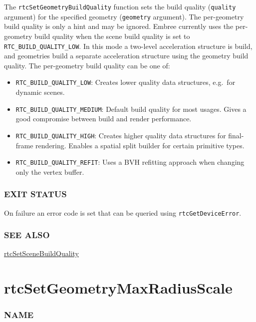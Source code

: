 The \texttt{rtcSetGeometryBuildQuality} function sets the build quality
(\texttt{quality} argument) for the specified geometry
(\texttt{geometry} argument). The per-geometry build quality is only a
hint and may be ignored. Embree currently uses the per-geometry build
quality when the scene build quality is set to
\texttt{RTC\_BUILD\_QUALITY\_LOW}. In this mode a two-level acceleration
structure is build, and geometries build a separate acceleration
structure using the geometry build quality. The per-geometry build
quality can be one of:

\begin{itemize}
\item
  \texttt{RTC\_BUILD\_QUALITY\_LOW}: Creates lower quality data
  structures, e.g.~for dynamic scenes.
\item
  \texttt{RTC\_BUILD\_QUALITY\_MEDIUM}: Default build quality for most
  usages. Gives a good compromise between build and render performance.
\item
  \texttt{RTC\_BUILD\_QUALITY\_HIGH}: Creates higher quality data
  structures for final-frame rendering. Enables a spatial split builder
  for certain primitive types.
\item
  \texttt{RTC\_BUILD\_QUALITY\_REFIT}: Uses a BVH refitting approach
  when changing only the vertex buffer.
\end{itemize}

\subsubsection{EXIT STATUS}\label{exit-status}

On failure an error code is set that can be queried using
\texttt{rtcGetDeviceError}.

\subsubsection{SEE ALSO}\label{see-also}

\hyperref[rtcsetscenebuildquality]{rtcSetSceneBuildQuality}

\pagebreak

\section{rtcSetGeometryMaxRadiusScale}\label{rtcsetgeometrymaxradiusscale}

\subsubsection{NAME}\label{name}

